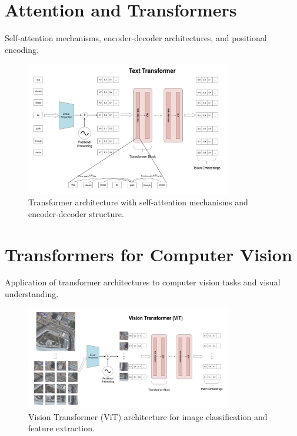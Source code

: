 \section{Attention and Transformers}

Self-attention mechanisms, encoder-decoder architectures, and positional encoding.

\begin{figure}[htbp]
\centering
\includegraphics[width=0.8\textwidth]{Images/transformer.png}
\caption{Transformer architecture with self-attention mechanisms and encoder-decoder structure.}
\label{fig:transformer}
\end{figure}

\section{Transformers for Computer Vision}

Application of transformer architectures to computer vision tasks and visual understanding.

\begin{figure}[htbp]
\centering
\includegraphics[width=0.8\textwidth]{Images/vit.png}
\caption{Vision Transformer (ViT) architecture for image classification and feature extraction.}
\label{fig:vit}
\end{figure}

